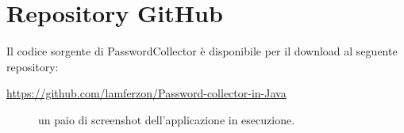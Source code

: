 \documentclass[a4paper, 12pt, one column, aas_macros]{article}
\begin{document}
	\section{Repository GitHub}
	Il codice sorgente di PasswordCollector è disponibile per il download al seguente repository:
	\begin{center}
		\url{https://github.com/lamferzon/Password-collector-in-Java}
	\end{center}
	\begin{figure}[h!]
		\centering
		\caption[]{un paio di screenshot dell'applicazione in esecuzione.}
		\label{App_screens}
	\end{figure}
	
\end{document}
